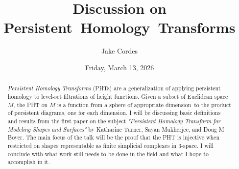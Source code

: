\documentclass{UAmathtalk}
\author{Jake Cordes}
\title{Discussion on Persistent~Homology~Transforms}
\date{Friday, March 13, 2026}
\begin{document}
\maketitle

\begin{abstract}
\emph{Persistent Homology Transforms} (PHTs) are a generalization of applying persistent homology to level-set filtrations of height functions. 
Given a subset of Euclidean space $M$, the PHT on $M$ is a function from a sphere of appropriate dimension to the product of persistent diagrams, one for each dimension. I will be discussing basic definitions and results from the first paper on the subject \emph{"Persistent Homology Transform for Modeling Shapes and Surfaces"} by Katharine Turner, Sayan Mukherjee, and Doug M Boyer. The main focus of the talk will be the proof that the PHT is injective when restricted on shapes representable as finite simplicial complexes in 3-space. I will conclude with what work still needs to be done in the field and what I hope to accomplish in it.
\end{abstract}
\end{document}

